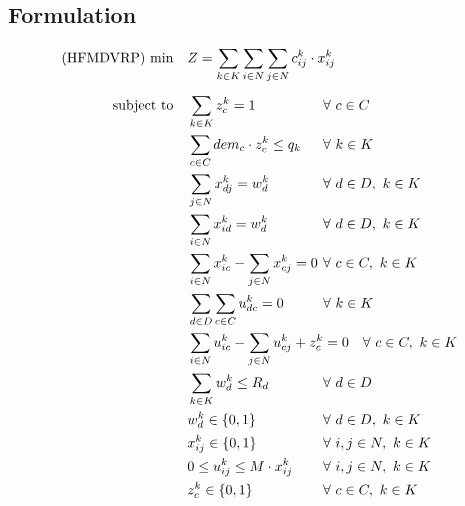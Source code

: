 \documentclass[preprint,review,12pt]{elsarticle}
\begin{document}
\subsection{Formulation}

\begin{align}
    \text{(HFMDVRP) min} \quad        & Z = \sum\limits_{k\in K}\sum\limits_{i\in N}\sum\limits_{j\in N} c_{ij}^k \cdot x_{ij}^k    && \label{MDMVRP_FObj}    \\[5pt]
	\noindent \text{subject to} \quad & \sum\limits_{k \in K} z_{c}^k = 1  && \text{\hspace{-1cm}} \forall \ c \in C \label{MDMVRP_Service} \\
	& \sum\limits_{c \in C}dem_c \cdot z_{c}^k \leq q_k               && \text{\hspace{-1cm}} \forall \ k \in K  \label{MDMVRP_Capacity} \\
	& \sum\limits_{j \in N}x_{dj}^k = w_d^k                                         && \text{\hspace{-1cm}} \forall \ d \in D,\ k \in K \label{MDMVRP_StartRoute} \\
	& \sum\limits_{i \in N}x_{id}^k = w_d^k                                         && \text{\hspace{-1cm}} \forall \ d \in D,\ k \in K \label{MDMVRP_EndRoute} \\
	& \sum\limits_{i \in N}x_{ic}^k - \sum\limits_{j \in N}x_{cj}^k = 0             && \text{\hspace{-1cm}} \forall \ c \in C,\ k \in K \label{MDMVRP_Balance} \\
	& \sum\limits_{d \in D}\sum\limits_{c \in C}u_{dc}^k = 0 && \text{\hspace{-1cm}} \forall \ k \in K \label{MDVMRP_InitialU} \\
	& \sum\limits_{i \in N}u_{ic}^k - \sum\limits_{j \in N}u_{cj}^k + z_{c}^k = 0             && \text{\hspace{0cm}} \forall \ c \in C,\ k \in K \label{MDMVRP_Flow} \\
	& \sum\limits_{k \in K}w_d^k \leq R_d                                     && \text{\hspace{-1cm}} \forall \ d \in D \label{MDMVRP_CapacityD} \\
	& w_d^k \in\{0,1\}  && \text{\hspace{-1cm}} \forall \ d \in D, \ k \in K \label{MDVMRP_DomainW} \\
	& x_{ij}^k\in\{0,1\} && \text{\hspace{-1cm}} \forall \ i,j \in N,  \ k \in K \label{MDVMRP_DomainX} \\
	& 0 \leq u_{ij}^k \leq M \cdot x_{ij}^k && \text{\hspace{-1cm}} \forall \ i,j \in N,  \ k \in K \label{MDVMRP_DomainU} \\
	& z_{c}^k\in\{0,1\} && \text{\hspace{-1cm}} \forall \ c \in C,  \ k \in K \label{MDVMRP_DomainZ} 
\end{align}
\end{document}
